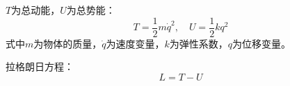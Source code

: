 $T$为总动能，$U$为总势能：
\begin{equation}\label{2.5}
T = \frac{1}{2}m\dot q^2, \quad U = \frac{1}{2}kq^2
\end{equation}
式中$m$为物体的质量，$\dot q$为速度变量，$k$为弹性系数，$q$为位移变量。

拉格朗日方程：
\begin{equation}\label{2.6}
L=T-U
\end{equation}











